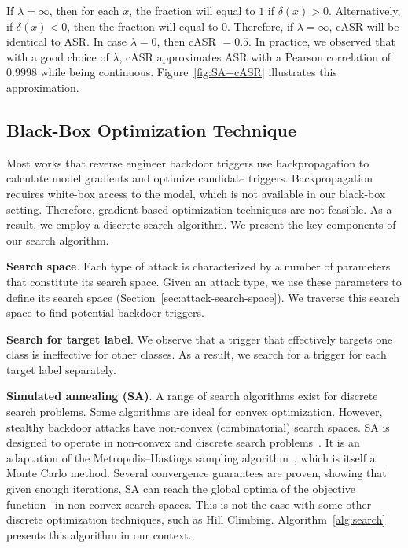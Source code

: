 \documentclass[letterpaper,twocolumn,10pt]{article}
\begin{document}
If $\lambda=\infty$, then for each $x$, the fraction will equal to $1$ if $\delta(x)>0$. Alternatively, if $\delta(x)<0$, then the fraction will equal to $0$. Therefore, if $\lambda=\infty$, cASR will be identical to ASR. In case $\lambda=0$, then cASR $= 0.5$. In practice, we observed that with a good choice of $\lambda$, cASR approximates ASR with a Pearson correlation of $0.9998$ while being continuous. Figure~\ref{fig:SA+cASR} illustrates this approximation.


\subsection{Black-Box Optimization Technique}
\label{sec:search-algo}

Most works that reverse engineer backdoor triggers use backpropagation to calculate model gradients and optimize candidate triggers. Backpropagation requires white-box access to the model, which is not available in our black-box setting. Therefore, gradient-based optimization techniques are not feasible. As a result, we employ a discrete search algorithm. We present the key components of our search algorithm.

\textbf{Search space}. Each type of attack is characterized by a number of parameters that constitute its search space. Given an attack type, we use these parameters to define its search space (Section~\ref{sec:attack-search-space}). We traverse this search space to find potential backdoor triggers.

\textbf{Search for target label}. We observe that a trigger that effectively targets one class is ineffective for other classes. As a result, we search for a trigger for each target label separately. 

\textbf{Simulated annealing (SA)}.
A range of search algorithms exist for discrete search problems. Some algorithms are ideal for convex optimization. However, stealthy backdoor attacks have non-convex (combinatorial) search spaces. SA is designed to operate in non-convex and discrete search problems~\cite{vanLaarhoven1987annealing}. It is an adaptation of the Metropolis–Hastings sampling algorithm~\cite{chib1995metro}, which is itself a Monte Carlo method. Several convergence guarantees are proven, showing that given enough iterations, SA can reach the global optima of the objective function~\cite{adams1994convergence, chib1995metro} in non-convex search spaces. This is not the case with some other discrete optimization techniques, such as Hill Climbing. Algorithm~\ref{alg:search} presents this algorithm in our context.
\end{document}
